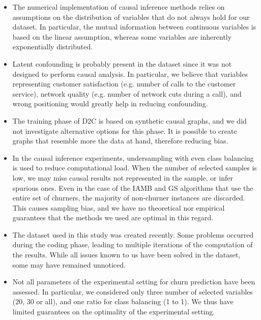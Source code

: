 \begin{itemize}
	\item The numerical implementation of causal inference methods relies on
	assumptions on the distribution of variables that do not always hold for
	our dataset. In particular, the mutual information between continuous
	variables is based on the linear assumption, whereas some variables are
	inherently exponentially distributed.

    \item Latent confounding is probably present in the dataset since it was not
    designed to perform causal analysis. In particular, we believe that
    variables representing customer satisfaction (e.g. number of calls to the
    customer service), network quality (e.g. number of network cuts during a
    call), and wrong positioning would greatly help in reducing confounding.

	\item The training phase of D2C is based on synthetic causal graphs, and we
	did not investigate alternative options for this phase. It is possible to
	create graphs that resemble more the data at hand, therefore reducing bias.

	\item In the causal inference experiments, undersampling with even class
	balancing is used to reduce computational load. When the number of selected
	samples is low, we may miss causal results not represented in the sample, or
	infer spurious ones. Even in the case of the IAMB and GS algorithms that use
	the entire set of churners, the majority of non-churner instances are
	discarded. This causes sampling bias, and we have no theoretical nor
	empirical guarantees that the methods we used are optimal in this regard.

	\item The dataset used in this study was created recently. Some problems
	occurred during the coding phase, leading to multiple iterations of the
	computation of the results. While all issues known to us have been solved
	in the dataset, some may have remained unnoticed.

	\item Not all parameters of the experimental setting for churn prediction
	have been assessed. In particular, we considered only three number of
	selected variables (20, 30 or all), and one ratio for class balancing (1 to
	1). We thus have limited guarantees on the optimality of the experimental
	setting.

\end{itemize}

